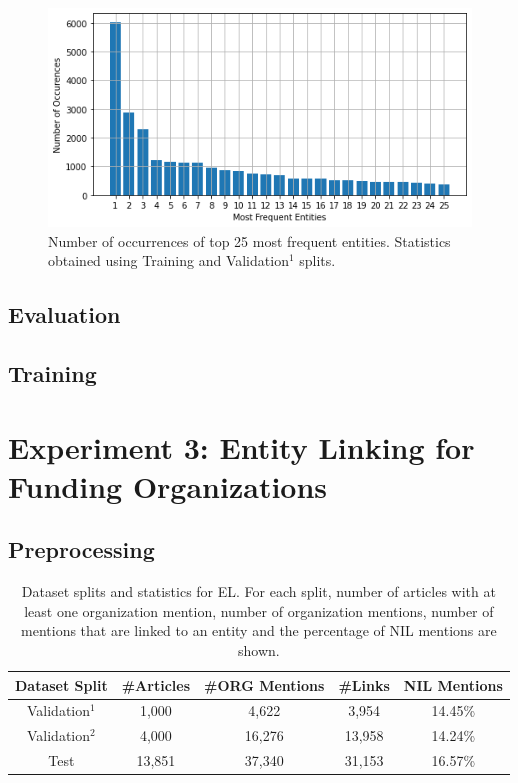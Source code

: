 \documentclass{report}
\theoremstyle{definition}
\theoremstyle{remark}
\begin{document}
\begin{figure}[h!]
    \centering
    \includegraphics[scale=0.6]{ent_occ.png}
    \caption{Number of occurrences of top 25 most frequent entities. Statistics obtained using Training and Validation$^1$ splits.}
    \label{fig:entpopul}
\end{figure}

\subsection{Evaluation}
\subsection{Training}
\section{Experiment 3: Entity Linking for Funding Organizations}
\label{sec:ELExperiment} 
\subsection{Preprocessing}
\begin{table}[h!]
    \centering
    \begin{tabular}{ccccc}
     Dataset Split & \#Articles & \#ORG Mentions & \#Links & NIL Mentions  \\
     \hline
    Validation$^1$ & 1,000  & 4,622 & 3,954  & 14.45\% \\
    Validation$^2$ & 4,000  & 16,276 & 13,958 & 14.24\% \\
    Test           & 13,851 & 37,340 & 31,153 & 16.57\% \\
    \end{tabular}
    \caption{Dataset splits and statistics for EL. For each split, number of articles with at least one organization mention, number of organization mentions, number of mentions that are linked to an entity and the percentage of NIL mentions are shown.}
    \label{tab:goldstatsel}
\end{table}
\end{document}
